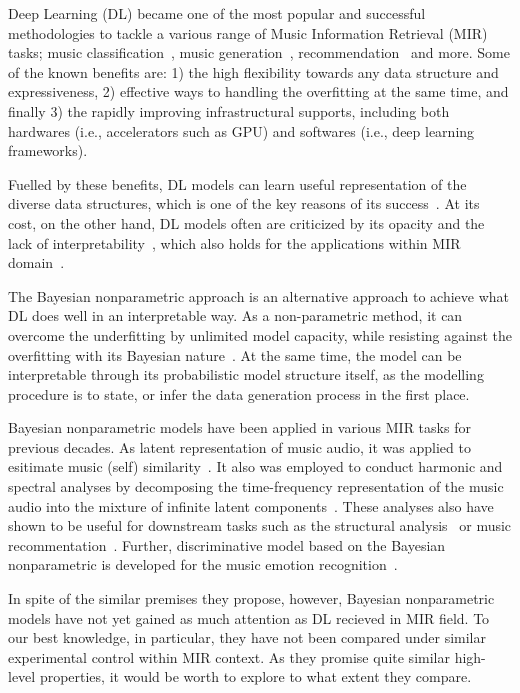 \documentclass{article}
\begin{document}
Deep Learning (DL) became one of the most popular and successful methodologies to tackle a various range of Music Information Retrieval (MIR) tasks; music classification~\cite{musicclassification:book}, music generation~\cite{briot2019deep}, recommendation~\cite{10.3389/fams.2019.00044} and more. Some of the known benefits are: 1) the high flexibility towards any data structure and expressiveness, 2) effective ways to handling the overfitting at the same time, and finally 3) the rapidly improving infrastructural supports, including both hardwares (i.e., accelerators such as GPU) and softwares (i.e., deep learning frameworks).

Fuelled by these benefits, DL models can learn useful representation of the diverse data structures, which is one of the key reasons of its success~\cite{DBLP:conf/ismir/HumphreyBL12}. At its cost, on the other hand, DL models often are criticized by its opacity and the lack of interpretability~\cite{DBLP:conf/dsaa/GilpinBYBSK18}, which also holds for the applications within MIR domain~\cite{DBLP:journals/tmm/Sturm14,DBLP:journals/cie/Sturm16}.

The Bayesian nonparametric approach is an alternative approach to achieve what DL does well in an interpretable way. As a non-parametric method, it can overcome the underfitting by unlimited model capacity, while resisting against the overfitting with its Bayesian nature~\cite{DBLP:reference/ml/Teh17}. At the same time, the model can be interpretable through its probabilistic model structure itself, as the modelling procedure is to state, or infer the data generation process in the first place.

Bayesian nonparametric models have been applied in various MIR tasks for previous decades. As latent representation of music audio, it was applied to esitimate music (self) similarity~\cite{DBLP:conf/icassp/QiPC07, DBLP:conf/ismir/HoffmanBC08}. It also was employed to conduct harmonic and spectral analyses by decomposing the time-frequency representation of the music audio into the mixture of infinite latent components~\cite{Hoffman09findinglatent, DBLP:conf/icassp/NakanoRKOS11}. These analyses also have shown to be useful for downstream tasks such as the structural analysis~\cite{DBLP:conf/icassp/NakanoOKMK12} or music recommentation~\cite{DBLP:conf/ismir/YoshiiG09}. Further, discriminative model based on the Bayesian nonparametric is developed for the music emotion recognition~\cite{DBLP:journals/taffco/WangLCCH15}.

In spite of the similar premises they propose, however, Bayesian nonparametric models have not yet gained as much attention as DL recieved in MIR field. To our best knowledge, in particular, they have not been compared under similar experimental control within MIR context. As they promise quite similar high-level properties, it would be worth to explore to what extent they compare.
\end{document}
